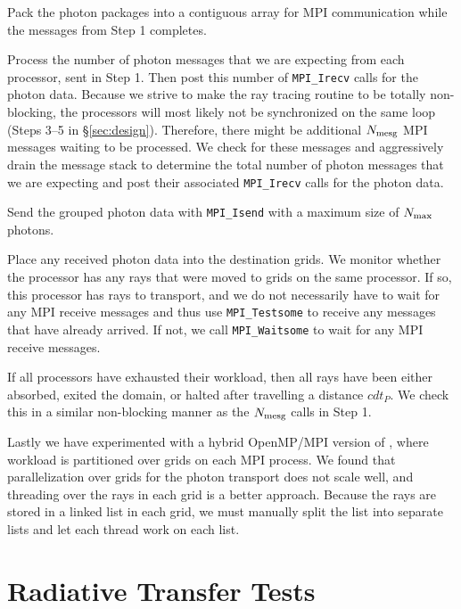 \documentclass[apj,onecolumn]{emulateapj}
\begin{document}
 Pack the photon packages into a contiguous array for MPI
communication while the messages from Step 1 completes.

 Process the number of photon messages that we are expecting
from each processor, sent in Step 1.  Then post this number of
\texttt{MPI\_Irecv} calls for the photon data.  Because we strive to
make the ray tracing routine to be totally non-blocking, the
processors will most likely not be synchronized on the same loop
(Steps 3--5 in \S\ref{sec:design}).  Therefore, there might be
additional $N_{\rm mesg}$ MPI messages waiting to be processed.  We
check for these messages and aggressively drain the message stack to
determine the total number of photon messages that we are expecting
and post their associated \texttt{MPI\_Irecv} calls for the photon
data.

 Send the grouped photon data with \texttt{MPI\_Isend} with a
maximum size of $N_{\rm max}$ photons.

 Place any received photon data into the destination grids.
We monitor whether the processor has any rays that were moved to grids
on the same processor.  If so, this processor has rays to transport,
and we do not necessarily have to wait for any MPI receive messages
and thus use \texttt{MPI\_Testsome} to receive any messages that have
already arrived.  If not, we call \texttt{MPI\_Waitsome} to wait for
any MPI receive messages.

 If all processors have exhausted their workload, then all
rays have been either absorbed, exited the domain, or halted after
travelling a distance $cdt_P$.  We check this in a similar
non-blocking manner as the $N_{\rm mesg}$ calls in Step 1.

Lastly we have experimented with a hybrid OpenMP/MPI version of \enzo,
where workload is partitioned over grids on each MPI process.  We
found that parallelization over grids for the photon transport does
not scale well, and threading over the rays in each grid is a better
approach.  Because the rays are stored in a linked list in each grid,
we must manually split the list into separate lists and let each
thread work on each list.

\section{Radiative Transfer Tests}
\label{sec:rt_tests}
\end{document}

